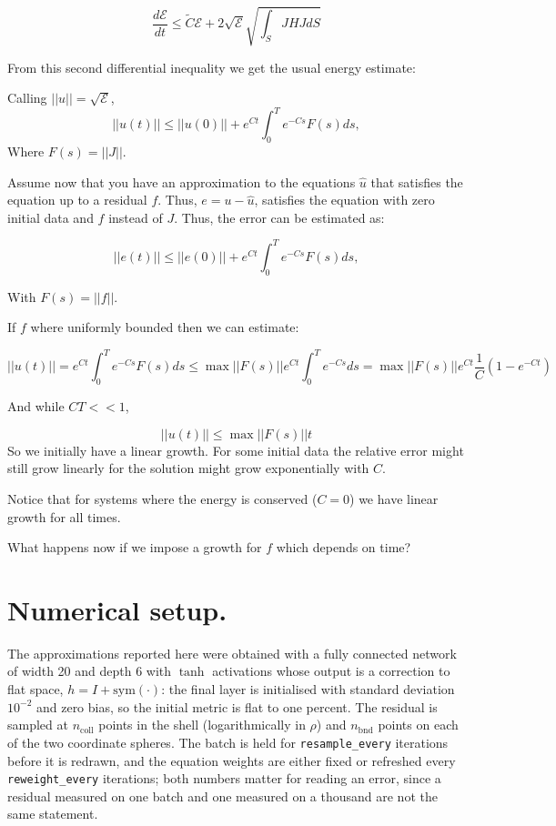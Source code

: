\documentclass[11pt]{amsart}
\theoremstyle{proof}
\theoremstyle{definition}
\theoremstyle{example}
\theoremstyle{remark}
\numberwithin{equation}{section}
\begin{document}
$$
\frac{d\mathcal{E}}{dt} \leq \tilde{C}\mathcal{E} +  2 \sqrt{\mathcal{E} } \sqrt{\int_{S} JHJ dS}  
$$

From this second differential inequality we get the usual energy estimate:

Calling $||u|| = \sqrt{\mathcal{E}}$, 
$$
||u(t)|| \leq ||u(0)||  + e^{Ct} \int_0^T e^{-Cs} F(s) ds,
$$
%
Where $F(s) =  ||J|| $.

Assume now that you have an approximation to the equations $\hat{u}$ that satisfies the equation up to a residual $f$.
Thus, $e = u - \hat{u}$, satisfies the equation with zero initial data and $f$ instead of $J$. Thus, the error can be estimated as:


$$
||e(t)|| \leq ||e(0)||  + e^{Ct} \int_0^T e^{-Cs} F(s) ds,
$$


With  $F(s) =  ||f|| $.

If $f$ where uniformly bounded then we can estimate:

$$
||u(t)|| = e^{Ct} \int_0^T e^{-Cs} F(s) ds \leq \max{||F(s)||} e^{Ct} \int_0^T e^{-Cs} ds = \max{||F(s)||} e^{Ct} \frac{1}{C}(1 - e^{-Ct} )
$$

And while $CT << 1$, 

$$
||u(t)|| \leq \max{||F(s)||} t
$$
So we initially have a linear growth.  
For some initial data the relative error might still grow linearly for the solution might grow exponentially with $C$. 

Notice that for systems where the energy is conserved ($C=0$) we have linear growth for all times.

What happens now if we impose a growth for $f$ which depends on time? 



\section{Numerical setup.}

The approximations reported here were obtained with a fully connected network of width 20 and
depth 6 with $\tanh$ activations whose output is a correction to flat space,
$h = I + \mathrm{sym}(\cdot)$: the final layer is initialised with standard deviation $10^{-2}$
and zero bias, so the initial metric is flat to one percent.  The residual is sampled at
$n_{\mathrm{coll}}$ points in the shell (logarithmically in $\rho$) and $n_{\mathrm{bnd}}$
points on each of the two coordinate spheres.  The batch is held for
\texttt{resample\_every} iterations before it is redrawn, and the equation weights are either
fixed or refreshed every \texttt{reweight\_every} iterations; both numbers matter for reading an
error, since a residual measured on one batch and one measured on a thousand are not the same
statement.
\end{document}
